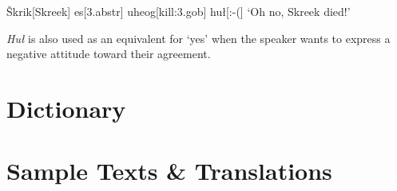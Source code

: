 \documentclass[a4paper,11pt,oneside,openany]{memoir}
\newcommand{\vS}{Š}
\begin{document}
\ex 
\begingl
\vS krik[Skreek]
es[\sc 3.abstr]
uheog[kill:{\sc 3.gob}]
hu\l[:-{(}]
\glft `Oh no, Skreek died!'
\endgl
\xe

\textit{Hu\l} is also used as an equivalent for `yes' when the speaker wants to express a negative attitude toward their agreement.


\part{Dictionary}

\pagestyle{headings}
\nouppercaseheads



\part{Sample Texts \& Translations}
\end{document}
